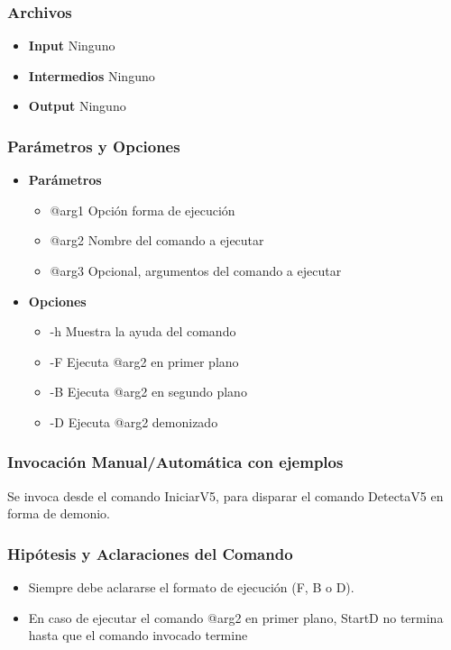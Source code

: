 \documentclass[a4paper,10pt,titlepage]{article}
\begin{document}
		\subsubsection{Archivos}
			\begin {itemize}
				\item \textbf{Input } {Ninguno}
				\item \textbf{Intermedios } {Ninguno}
				\item \textbf{Output } {Ninguno}
			\end{itemize}

		\subsubsection{Par\'ametros y Opciones}
			\begin {itemize}
				\item \textbf{Par\'ametros} {
					\begin{itemize}
						\item {@arg1 }{Opci\'on forma de ejecuci\'on} 
						\item {@arg2 }{Nombre del comando a ejecutar} 
						\item {@arg3 }{Opcional, argumentos del comando a ejecutar} 
					\end{itemize}
				}
				\item \textbf{Opciones}{
					\begin{itemize}
						\item {-h }{Muestra la ayuda del comando} 
						\item {-F }{Ejecuta @arg2 en primer plano} 
						\item {-B }{Ejecuta @arg2 en segundo plano}
						\item {-D }{Ejecuta @arg2 demonizado}
					\end{itemize}
				}
			\end{itemize}
	
		\subsubsection{Invocaci\'on Manual/Autom\'atica con ejemplos}
			Se invoca desde el comando IniciarV5, para disparar el comando DetectaV5 en forma de demonio.
				
		\subsubsection{Hip\'otesis y Aclaraciones del Comando}
			\begin{itemize}
				\item {}{Siempre debe aclararse el formato de ejecuci\'on (F, B o D).}
				\item{}{En caso de ejecutar el comando @arg2 en primer plano, StartD no termina hasta que el comando invocado termine}

			\end{itemize}
\end{document}
